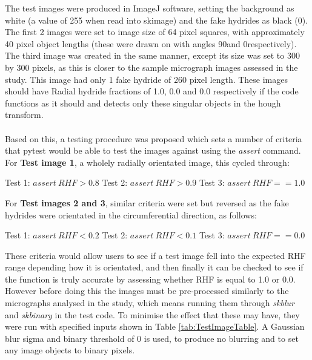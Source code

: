 \documentclass{article}
\begin{document}
    The test images were produced in ImageJ software, setting the background as white (a value of 255 when read into skimage) and the fake hydrides as black (0). The first 2 images were set to image size of 64 pixel squares, with approximately 40 pixel object lengths (these were drawn on with angles 90\textdegree and 0\textdegree respectively). The third image was created in the same manner, except its size was set to 300 by 300 pixels, as this is closer to the sample micrograph images assessed in the study. This image had only 1 fake hydride of 260 pixel length. These images should have Radial hydride fractions of 1.0, 0.0 and 0.0 respectively if the code functions as it should and detects only these singular objects in the hough transform.
    \\
    \\
    Based on this, a testing procedure was proposed which sets a number of criteria that pytest would be able to test the images against using the \textit{assert} command. For \textbf{Test image 1}, a wholely radially orientated image, this cycled through:

    \begin{center}
        Test 1: $assert\:RHF > 0.8$ \newline
        Test 2: $assert\:RHF > 0.9$ \newline
        Test 3: $assert\:RHF == 1.0$ \newline
    \end{center}

    For \textbf{Test images 2 and 3}, similar criteria were set but reversed as the fake hydrides were orientated in the circumferential direction, as follows:
    \begin{center}
        Test 1: $assert\:RHF < 0.2$ \newline
        Test 2: $assert\:RHF < 0.1$ \newline
        Test 3: $assert\:RHF == 0.0$ \newline 
    \end{center}

    These criteria would allow users to see if a test image fell into the expected RHF range depending how it is orientated, and then finally it can be checked to see if the function is truly accurate by assessing whether RHF is equal to 1.0 or 0.0.  However before doing this the images must be pre-processed similarly to the micrographs analysed in the study, which means running them through \textit{skblur} and \textit{skbinary} in the test code. To minimise the effect that these may have, they were run with specified inputs shown in Table \ref{tab:TestImageTable}. A Gaussian blur sigma and binary threshold of 0 is used, to produce no blurring and to set any image objects to binary pixels.
\end{document}
